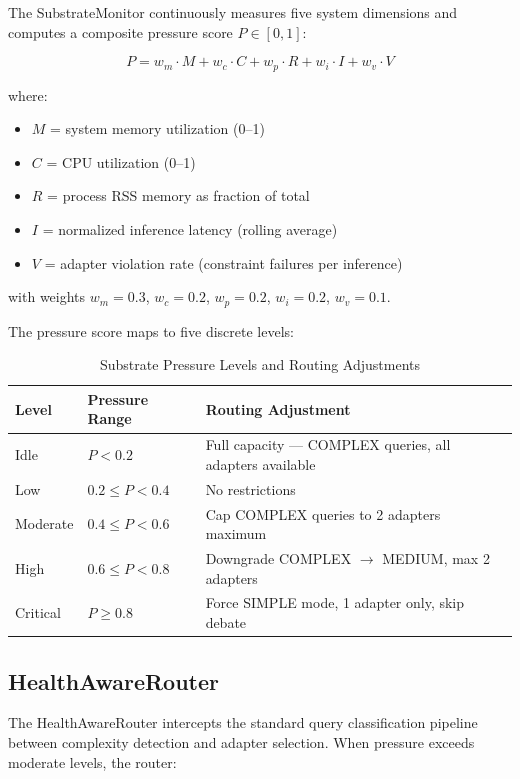 The SubstrateMonitor continuously measures five system dimensions and computes
a composite pressure score $P \in [0, 1]$:

\begin{equation}
P = w_m \cdot M + w_c \cdot C + w_p \cdot R + w_i \cdot I + w_v \cdot V
\label{eq:pressure}
\end{equation}

where:
\begin{itemize}
    \item $M$ = system memory utilization (0--1)
    \item $C$ = CPU utilization (0--1)
    \item $R$ = process RSS memory as fraction of total
    \item $I$ = normalized inference latency (rolling average)
    \item $V$ = adapter violation rate (constraint failures per inference)
\end{itemize}

with weights $w_m = 0.3$, $w_c = 0.2$, $w_p = 0.2$, $w_i = 0.2$, $w_v = 0.1$.

The pressure score maps to five discrete levels:

\begin{table}[h]
\centering
\caption{Substrate Pressure Levels and Routing Adjustments}
\label{tab:pressure-levels}
\begin{tabular}{llp{6.5cm}}
\toprule
\textbf{Level} & \textbf{Pressure Range} & \textbf{Routing Adjustment} \\
\midrule
Idle     & $P < 0.2$ & Full capacity --- COMPLEX queries, all adapters available \\
Low      & $0.2 \leq P < 0.4$ & No restrictions \\
Moderate & $0.4 \leq P < 0.6$ & Cap COMPLEX queries to 2 adapters maximum \\
High     & $0.6 \leq P < 0.8$ & Downgrade COMPLEX $\to$ MEDIUM, max 2 adapters \\
Critical & $P \geq 0.8$ & Force SIMPLE mode, 1 adapter only, skip debate \\
\bottomrule
\end{tabular}
\end{table}

\subsection{HealthAwareRouter}

The HealthAwareRouter intercepts the standard query classification pipeline
between complexity detection and adapter selection. When pressure exceeds
moderate levels, the router:

